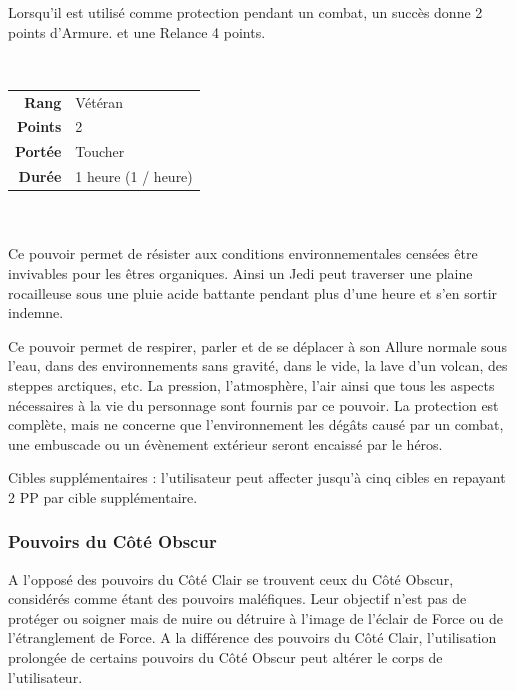 \begin{description}[align=left]
        Lorsqu’il est utilisé comme protection pendant un combat, un succès donne 2 points d’Armure. et une Relance 4 points.
        \\

    \item [Adaptation de Force] ~ \\

        \begin{tabular}{ r l }
            \textbf{Rang}    & Vétéran \\
            \textbf{Points}  & 2 \\
            \textbf{Portée}  & Toucher \\
            \textbf{Durée}   & 1 heure (1 / heure) \\
        \end{tabular}
        \\ \\
        Ce pouvoir permet de résister aux conditions environnementales censées être invivables pour les êtres organiques. Ainsi un Jedi peut traverser une plaine rocailleuse sous une pluie acide battante pendant plus d’une heure et s’en sortir indemne.

        Ce pouvoir permet de respirer, parler et de se déplacer à son Allure normale sous l’eau, dans des environnements sans gravité, dans le vide, la lave d’un volcan, des steppes arctiques, etc. La pression, l’atmosphère, l’air ainsi que tous les aspects nécessaires à la vie du personnage sont fournis par ce pouvoir. La protection est complète, mais ne concerne que l’environnement les dégâts causé par un combat, une embuscade ou un évènement extérieur seront encaissé par le héros.

        Cibles supplémentaires : l’utilisateur peut affecter jusqu’à cinq cibles en repayant 2 PP par cible supplémentaire.
        \\

\end{description}

\subsubsection{Pouvoirs du Côté Obscur}

A l’opposé des pouvoirs du Côté Clair se trouvent ceux du Côté Obscur, considérés comme étant des pouvoirs maléfiques. Leur objectif n’est pas de protéger ou soigner mais de nuire ou détruire à l’image de l’éclair de Force ou de l’étranglement de Force. A la différence des pouvoirs du Côté Clair, l’utilisation prolongée de certains pouvoirs du Côté Obscur peut altérer le corps de l’utilisateur.

